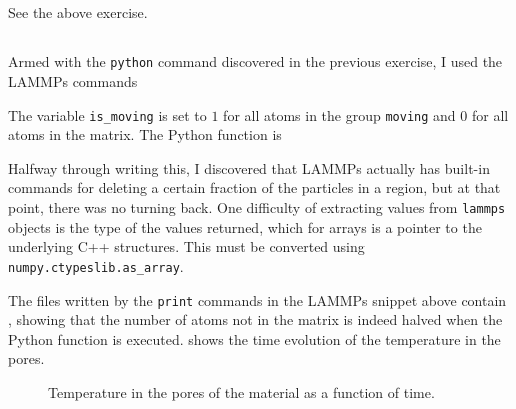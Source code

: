 \documentclass[11pt,british,a4paper]{report}
\begin{document}
\subsection{}
See the above exercise.

\subsection{}
Armed with the \texttt{python} command discovered in the previous exercise, I used the LAMMPs commands

The variable \texttt{is\_moving} is set to \(1\) for all atoms in the group \texttt{moving} and \(0\) for all atoms in the matrix. The Python function is

Halfway through writing this, I discovered that LAMMPs actually has built-in commands for deleting a certain fraction of the particles in a region, but at that point, there was no turning back. One difficulty of extracting values from \texttt{lammps} objects is the type of the values returned, which for arrays is a pointer to the underlying C++ structures. This must be converted using \texttt{numpy.ctypeslib.as\_array}.

The files written by the \texttt{print} commands in the LAMMPs snippet above contain , showing that the number of atoms not in the matrix is indeed halved when the Python function is executed.  shows the time evolution of the temperature in the pores.

\begin{figure}[tbh]
    \centering
    \caption{Temperature in the pores of the material as a function of time.}%
    \label{fig:temppores}
\end{figure}
\end{document}
